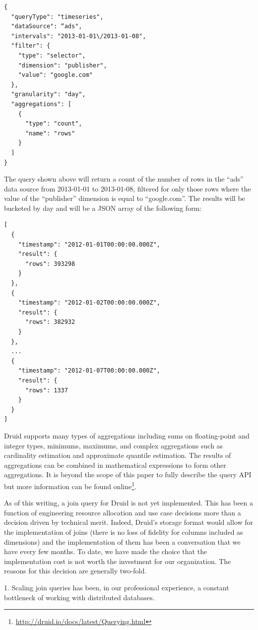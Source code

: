 \documentclass{vldb}
\begin{document}
{\scriptsize\begin{verbatim}
{
  "queryType": "timeseries",
  "dataSource": “ads",
  "intervals": "2013-01-01\/2013-01-08",
  "filter": {
    "type": "selector",
    "dimension": "publisher",
    "value": "google.com"
  },
  "granularity": "day",
  "aggregations": [
    {
      "type": "count",
      "name": "rows"
    }
  ]
}
\end{verbatim}}

The query shown above will return a count of the number of rows in the “ads”
data source from 2013-01-01 to 2013-01-08, filtered for only those rows where
the value of the “publisher” dimension is equal to “google.com”. The results
will be bucketed by day and will be a JSON array of the following form: 

{\scriptsize\begin{verbatim}
[
  {
    "timestamp": "2012-01-01T00:00:00.000Z",
    "result": {
      "rows": 393298
    }
  },
  {
    "timestamp": "2012-01-02T00:00:00.000Z",
    "result": {
      "rows": 382932
    }
  },
  ...
  {
    "timestamp": "2012-01-07T00:00:00.000Z",
    "result": {
      "rows": 1337
    }
  }
]
\end{verbatim}}

Druid supports many types of aggregations including sums on floating-point and
integer types, minimums, maximums, and complex aggregations such as cardinality
estimation and approximate quantile estimation. The results of aggregations can
be combined in mathematical expressions to form other aggregations. It is
beyond the scope of this paper to fully describe the query API but more
information can be found
online\footnote{\href{http://druid.io/docs/latest/Querying.html}{http://druid.io/docs/latest/Querying.html}}. 

As of this writing, a join query for Druid is not yet implemented. This has
been a function of engineering resource allocation and use case decisions more
than a decision driven by technical merit. Indeed, Druid’s storage format would
allow for the implementation of joins (there is no loss of fidelity for columns
included as dimensions) and the implementation of them has been a conversation
that we have every few months. To date, we have made the choice that the
implementation cost is not worth the investment for our organization. The
reasons for this decision are generally two-fold. 

1. Scaling join queries has been, in our professional experience, a constant
bottleneck of working with distributed databases. 
\end{document}
